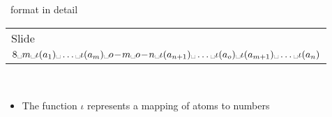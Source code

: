 \begin{frame}[c]{\smodels\ format in detail}
\begin{tabular}{|l|}
      Slide~\pageref{eqn:rule:disjunctive}
      \\
      \(
      8\myspace
      m\myspace
      \iota(a_1)\myspace\dots\myspace\iota(a_{m})\myspace
      o\!-\!m\myspace
      o\!-\!n\myspace
      \iota(a_{n+1})\myspace\dots\myspace\iota(a_{o})\myspace
      \iota(a_{m+1})\myspace\dots\myspace\iota(a_{n})
      \)
      \\
      \hline
    \end{tabular}
    \\
    \medskip
    \normalsize
    \begin{itemize}
    \item<1-> The function $\iota$ represents a mapping of atoms to numbers
    \end{itemize}
\end{frame}
%
